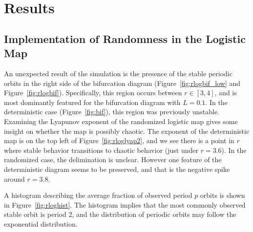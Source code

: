 \chapter{Results}
\section{Implementation of Randomness in the Logistic Map}
An unexpected result of the simulation is the presence of the stable
periodic orbits in the right side of the bifurcation diagram
(Figure~\ref{fig:rlogbif_low} and
Figure~\ref{fig:rlogbif}). Specifically, this region occurs between $r
\in [3,4]$, and is most dominantly featured for the bifurcation diagram with $L=0.1$. In the
deterministic case (Figure~\ref{fig:bif}), this region was previously
unstable. Examining the Lyapunov exponent of the randomized logistic
map gives some insight on whether the map is possibly chaotic. The
exponent of the deterministic map is on the top left of Figure~\ref{fig:rloglyap2},
and we see there is a point in $r$ where stable behavior transitions
to chaotic behavior (just under $r=3.6$). In the randomized case, the
delimination is unclear. However one feature of the deterministic
diagram seems to be preserved, and that is the negative spike around
$r=3.8$.

A histogram describing the average fraction of observed period $p$
orbits is shown in Figure~\ref{fig:rloghist}. The histogram implies
that the most commonly observed stable orbit is period 2, and the
distribution of periodic orbits may follow the exponential distribution.

